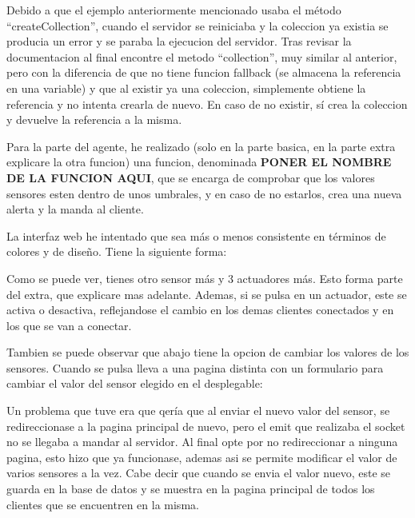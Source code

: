 \documentclass{article}
\begin{document}
Debido a que el ejemplo anteriormente mencionado usaba el método ``createCollection'', cuando el servidor se reiniciaba y la coleccion ya existia se producia un error y se paraba la ejecucion del servidor. Tras revisar la documentacion al final encontre el metodo ``collection'', muy similar al anterior, pero con la diferencia de que no tiene funcion fallback (se almacena la referencia en una variable) y que al existir ya una coleccion, simplemente obtiene la referencia y no intenta crearla de nuevo. En caso de no existir, sí crea la coleccion y devuelve la referencia a la misma.

Para la parte del agente, he realizado (solo en la parte basica, en la parte extra explicare la otra funcion) una funcion, denominada \textbf{PONER EL NOMBRE DE LA FUNCION AQUI}, que se encarga de comprobar que los valores sensores esten dentro de unos umbrales, y en caso de no estarlos, crea una nueva alerta y la manda al cliente.

La interfaz web he intentado que sea más o menos consistente en términos de colores y de diseño. Tiene la siguiente forma:



Como se puede ver, tienes otro sensor más y 3 actuadores más. Esto forma parte del extra, que explicare mas adelante. Ademas, si se pulsa en un actuador, este se activa o desactiva, reflejandose el cambio en los demas clientes conectados y en los que se van a conectar.

Tambien se puede observar que abajo tiene la opcion de cambiar los valores de los sensores. Cuando se pulsa lleva a una pagina distinta con un formulario para cambiar el valor del sensor elegido en el desplegable:


Un problema que tuve era que qería que al enviar el nuevo valor del sensor, se redireccionase a la pagina principal de nuevo, pero el emit que realizaba el socket no se llegaba a mandar al servidor. Al final opte por no redireccionar a ninguna pagina, esto hizo que ya funcionase, ademas asi se permite modificar el valor de varios sensores a la vez. Cabe decir que cuando se envia el valor nuevo, este se guarda en la base de datos y se muestra en la pagina principal de todos los clientes que se encuentren en la misma.

\end{document}
